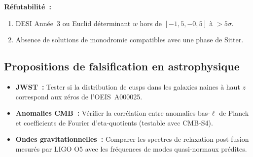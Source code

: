 \textbf{Réfutabilité~:}
\begin{enumerate}
  \item DESI Année~3 ou Euclid déterminant $w$ hors de $[-1{,}5, -0{,}5]$ à $>5\sigma$.
  \item Absence de solutions de monodromie compatibles avec une phase de Sitter.
\end{enumerate}

\subsection{Propositions de falsification en astrophysique}
\begin{itemize}
  \item \textbf{JWST~:} Tester si la distribution de cusps dans les galaxies naines à haut $z$ correspond aux zéros de l'OEIS~A000025.
  \item \textbf{Anomalies CMB~:} Vérifier la corrélation entre anomalies bas-$\ell$ de Planck et coefficients de Fourier d'eta-quotients (testable avec CMB-S4).
  \item \textbf{Ondes gravitationnelles~:} Comparer les spectres de relaxation post-fusion mesurés par LIGO O5 avec les fréquences de modes quasi-normaux prédites.
\end{itemize}
